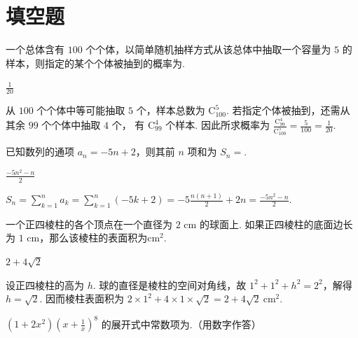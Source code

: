 \section{填空题}

\begin{problem}
一个总体含有 \(100\) 个个体，以简单随机抽样方式从该总体中抽取一个容量为 \(5\) 的样本，则指定的某个个体被抽到的概率为\fillinblank{}.
\end{problem}

\begin{answer}
\(\frac{1}{20}\)
\end{answer}

\begin{solution}
从 \(100\) 个个体中等可能抽取 \(5\) 个，样本总数为
\(\mathrm C_{100}^{5}\). 若指定个体被抽到，还需从其余 \(99\) 个个体中抽取 \(4\) 个，
有 \(\mathrm C_{99}^{4}\) 个样本. 因此所求概率为
\(\frac{\mathrm C_{99}^{4}}{\mathrm C_{100}^{5}}=\frac{5}{100}=\frac{1}{20}\).
\end{solution}

\begin{problem}
已知数列的通项 \(a_n=-5n+2\)，则其前 \(n\) 项和为 \(S_n=\)\fillinblank{}.
\end{problem}

\begin{answer}
\(\frac{-5n^2-n}{2}\)
\end{answer}

\begin{solution}
\(S_n=\sum_{k=1}^{n}a_k=\sum_{k=1}^{n}(-5k+2)
=-5\frac{n(n+1)}{2}+2n
=\frac{-5n^2-n}{2}\).
\end{solution}

\begin{problem}
一个正四棱柱的各个顶点在一个直径为 \(2\text{ cm}\) 的球面上. 如果正四棱柱的底面边长为 \(1\text{ cm}\)，那么该棱柱的表面积为\fillinblank{}\(\text{cm}^2\).
\end{problem}

\begin{answer}
\(2+4\sqrt{2}\)
\end{answer}

\begin{solution}
设正四棱柱的高为 \(h\). 球的直径是棱柱的空间对角线，故
\(1^2+1^2+h^2=2^2\)，解得 \(h=\sqrt{2}\). 因而棱柱表面积为
\(2\times1^2+4\times1\times\sqrt{2}=2+4\sqrt{2}\ \text{cm}^2\).
\end{solution}

\begin{problem}
\((1+2x^2)\left(x+\frac{1}{x}\right)^8\) 的展开式中常数项为\fillinblank{}.（用数字作答）
\end{problem}

